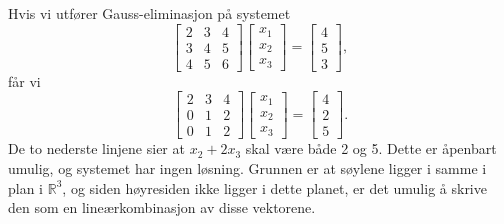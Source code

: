 \begin{ex}
	Hvis vi utf{\o}rer Gauss-eliminasjon p{\aa} systemet
	\begin{equation*}
	\begin{bmatrix}2 & 3& 4 \\  3& 4 & 5  \\ 4 &5 & 6 \end{bmatrix}\begin{bmatrix}x_{1} \\  x_{2}\\ x_{3} \end{bmatrix}=
	\begin{bmatrix}4 \\ 5\\ 3 \end{bmatrix},
	\end{equation*}
	f{\aa}r vi 
	\begin{equation*}
	\begin{bmatrix}2 & 3& 4 \\  0& 1 & 2  \\ 0 & 1 & 2 \end{bmatrix}\begin{bmatrix}x_{1} \\  x_{2}\\ x_{3} \end{bmatrix}=
	\begin{bmatrix}4 \\ 2\\ 5 \end{bmatrix}.
	\end{equation*}
	De to nederste linjene sier at $x_{2}+2x_{3}$ skal v{\ae}re b{\aa}de 2 og 5. Dette er åpenbart umulig, og systemet har ingen løsning. Grunnen er at søylene ligger i samme i plan i $\mathbb{R}^{3}$, og siden høyresiden ikke ligger i dette planet, er det umulig {\aa} skrive den som en line{\ae}rkombinasjon av disse vektorene.
\end{ex}

